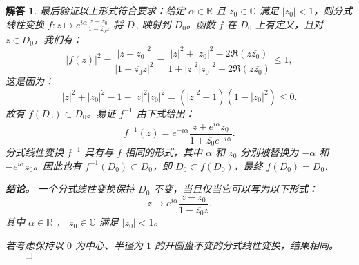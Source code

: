 \documentclass[12pt,UTF8]{ctexbook}
\theoremstyle{exercisestyle}
\theoremstyle{solutionstyle}
\newtheorem*{solution*}{解答}
\newenvironment{solution}
  {\begin{solution*}}
  {\hfill\ensuremath{\qed}\end{solution*}}
\begin{document}
\begin{solution}
最后验证以上形式符合要求：给定 \( \alpha \in \mathbb{R} \) 且 \( z_0 \in \mathbb{C} \) 满足 \( |z_0| < 1 \)，则分式线性变换 \( f: z \mapsto e^{i\alpha} \frac{z - z_0}{1 - \overline{z_0} z} \) 将 \( D_0 \) 映射到 \( D_0 \)。函数 \( f \) 在 \( D_0 \) 上有定义，且对 \( z \in D_0 \)，我们有：
\[
|f(z)|^2 = \frac{|z - z_0|^2}{|1 - \overline{z_0} z|^2} = \frac{|z|^2 + |z_0|^2 - 2 \Re(z \overline{z_0})}{1 + |z|^2 |z_0|^2 - 2 \Re(z \overline{z_0})} \leqslant 1,
\]
这是因为：
\[
|z|^2 + |z_0|^2 - 1 - |z|^2 |z_0|^2 = (|z|^2 - 1)(1 - |z_0|^2) \leqslant 0.
\]
故有 \( f(D_0) \subset D_0 \)。易证 \( f^{-1} \) 由下式给出：
\[
f^{-1}(z) = e^{-i\alpha} \frac{z + e^{i\alpha} z_0}{1 + \overline{z_0} e^{-i\alpha}}.
\]
分式线性变换 \( f^{-1} \) 具有与 \( f \) 相同的形式，其中 \( \alpha \) 和 \( z_0 \) 分别被替换为 \( -\alpha \) 和 \( -e^{i\alpha} z_0 \)。因此也有 \( f^{-1}(D_0) \subset D_0 \)，即 \( D_0 \subset f(D_0) \)，最终 \( f(D_0) = D_0 \).

\textbf{结论。} 一个分式线性变换保持 \( D_0 \) 不变，当且仅当它可以写为以下形式：
\[ z \mapsto e^{i\alpha} \frac{z - z_0}{1 - \overline{z_0} z}. \]
其中 \( \alpha \in \mathbb{R} \) ， \( z_0 \in \mathbb{C} \) 满足 \( |z_0| < 1 \)。

若考虑保持以 \( 0 \) 为中心、半径为 \( 1 \) 的开圆盘不变的分式线性变换，结果相同。
\end{solution}
\end{document}
